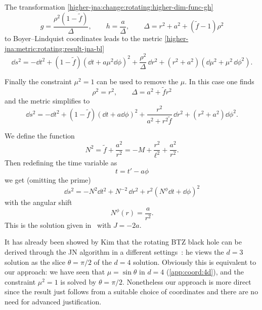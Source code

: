 The transformation \eqref{higher-jna:change:rotating:higher-dim-func-gh}
\begin{equation}
	g = \frac{\rho^2 (1 - \tilde f)}{\Delta}, \qquad
	h = \frac{a}{\Delta}, \qquad
	\Delta = r^2 + a^2 + (\tilde f - 1) \rho^2
\end{equation}
to Boyer--Lindquist coordinates leads to the metric \eqref{higher-jna:metric:rotating:result-jna-bl}
\begin{equation}
	\dd s^2 = - \dd t^2
		+ (1 - \tilde f) (\dd t + a \mu^2 \dd \phi )^2
		+ \frac{\rho^2}{\Delta}\, \dd r^2
		+ (r^2 + a^2) (\dd \mu^2 + \mu^2\, \dd \phi^2 ).
\end{equation} 

Finally the constraint $\mu^2 = 1$ can be used to remove the $\mu$.
In this case one finds
\begin{equation}
	\rho^2 = r^2, \qquad
	\Delta = a^2 + \tilde f r^2
\end{equation}
and the metric simplifies to
\begin{equation}
	\dd s^2 = - \dd t^2
		+ (1 - \tilde f) (\dd t + a \dd \phi )^2
		+ \frac{r^2}{a^2 + r^2 \tilde f}\, \dd r^2
		+ (r^2 + a^2) \dd \phi^2.
\end{equation} 

We define the function
\begin{equation}
	N^2 = \tilde f + \frac{a^2}{r^2} = - M + \frac{r^2}{\ell^2} + \frac{a^2}{r^2}.
\end{equation} 
Then redefining the time variable as~\cite{Kim:1997:NotesSpinningAdS3, Kim:1999:SpinningBTZBlack}
\begin{equation}
	t = t' - a \phi
\end{equation} 
we get (omitting the prime)
\begin{equation}
	\dd s^2 = - N^2 \dd t^2 + N^{-2}\, \dd r^2 + r^2 (N^\phi \dd t + \dd \phi)^2
\end{equation} 
with the angular shift
\begin{equation}
	N^\phi(r) = \frac{a}{r^2}.
\end{equation} 
This is the solution given in~\cite{Banados:1992:BlackHoleThree} with $J = -2a$.

It has already been showed by Kim that the rotating BTZ black hole can be derived through the JN algorithm in a different settings~\cite{Kim:1997:NotesSpinningAdS3, Kim:1999:SpinningBTZBlack}: he views the $d = 3$ solution as the slice $\theta = \pi/2$ of the $d = 4$ solution.
Obviously this is equivalent to our approach: we have seen that $\mu = \sin \theta$ in $d = 4$ (\cref{app:coord:4d}), and the constraint $\mu^2 = 1$ is solved by $\theta = \pi/2$.
Nonetheless our approach is more direct since the result just follows from a suitable choice of coordinates and there are no need for advanced justification.

